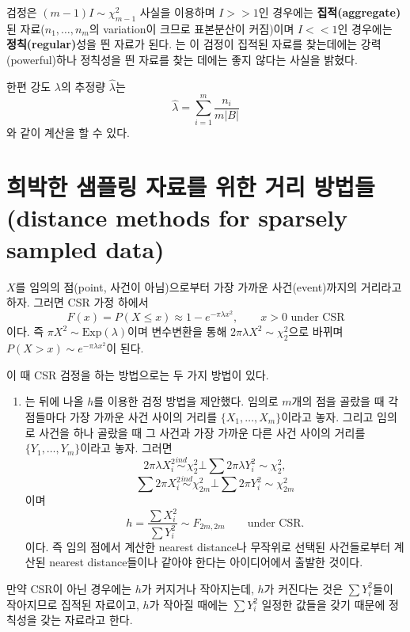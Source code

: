 \documentclass[b5paper,]{scrbook}
\providecommand{\tightlist}{%
  \setlength{\itemsep}{0pt}\setlength{\parskip}{0pt}}
\theoremstyle{plain}
\theoremstyle{definition}
\numberwithin{equation}{section}
\begin{document}
검정은 \((m-1)I \sim \chi_{m-1}^{2}\) 사실을 이용하며 \(I >> 1\)인
경우에는 \textbf{집적(aggregate)}된 자료(\(n_{1}, \ldots, n_{m}\)의
variation이 크므로 표본분산이 커짐)이며 \(I << 1\)인 경우에는
\textbf{정칙(regular)}성을 띈 자료가 된다. \citep{Diggle1979}는 이
검정이 집적된 자료를 찾는데에는 강력(powerful)하나 정칙성을 띈 자료를
찾는 데에는 좋지 않다는 사실을 밝혔다.

한편 강도 \(\lambda\)의 추정량 \(\hat{\lambda}\)는
\[\hat{\lambda}=\sum_{i=1}^{m}\frac{n_{i}}{m|B|}\] 와 같이 계산을 할 수
있다.

\section{희박한 샘플링 자료를 위한 거리 방법들(distance methods for
sparsely sampled
data)}\label{-----distance-methods-for-sparsely-sampled-data}

\(X\)를 임의의 점(point, 사건이 아님)으로부터 가장 가까운
사건(event)까지의 거리라고 하자. 그러면 CSR 가정 하에서
\[F(x)=P(X\leq x)\approx 1-e^{-\pi\lambda x^{2}}, \qquad{x>0\text{ under CSR}}\]
이다. 즉 \(\pi X^{2} \sim \text{Exp}(\lambda)\)이며 변수변환을 통해
\(2\pi \lambda X^{2} \sim \chi_{2}^{2}\)으로 바뀌며
\(P(X>x)\sim e^{-\pi\lambda x^{2}}\)이 된다.

이 때 CSR 검정을 하는 방법으로는 두 가지 방법이 있다.

\begin{enumerate}
\def\labelenumi{\arabic{enumi}.}
\tightlist
\item
  \citep{Hopkins1954}는 뒤에 나올 \(h\)를 이용한 검정 방법을 제안했다.
  임의로 \(m\)개의 점을 골랐을 때 각 점들마다 가장 가까운 사건 사이의
  거리를 \(\{X_{1}, \ldots, X_{m}\}\)이라고 놓자. 그리고 임의로 사건을
  하나 골랐을 때 그 사건과 가장 가까운 다른 사건 사이의 거리를
  \(\{Y_{1}, \ldots, Y_{m}\}\)이라고 놓자. 그러면
  \[2\pi\lambda X_{i}^{2} \stackrel{ind}{\sim} \chi_{2}^{2} \bot \sum 2\pi\lambda Y_{i}^{2} \sim \chi_{2}^{2},\]
  \[\sum 2\pi X_{i}^{2} \stackrel{ind}{\sim} \chi_{2m}^{2} \bot \sum 2\pi Y_{i}^{2} \sim \chi_{2m}^{2}\]
  이며
  \[h=\frac{\sum X_{i}^{2}}{\sum Y_{i}^{2}} \sim F_{2m,2m} \qquad{\text{under CSR.}}\]
  이다. 즉 임의 점에서 계산한 nearest distance나 무작위로 선택된
  사건들로부터 계산된 nearest distance들이나 같아야 한다는 아이디어에서
  출발한 것이다.
\end{enumerate}

만약 CSR이 아닌 경우에는 \(h\)가 커지거나 작아지는데, \(h\)가 커진다는
것은 \(\sum Y_{i}^{2}\)들이 작아지므로 집적된 자료이고, \(h\)가 작아질
때에는 \(\sum Y_{i}^{2}\) 일정한 값들을 갖기 때문에 정칙성을 갖는
자료라고 한다.
\end{document}
